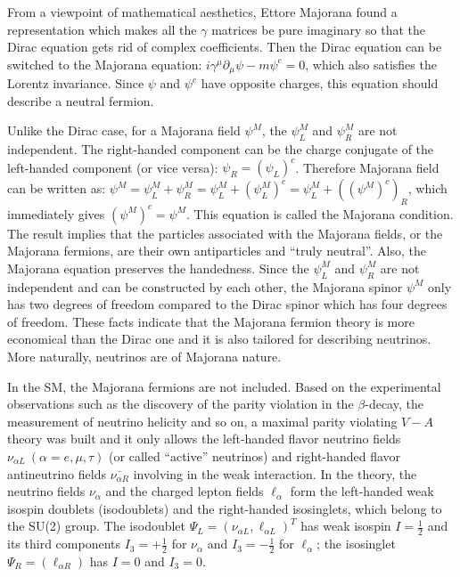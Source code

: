 From a viewpoint of mathematical aesthetics, Ettore Majorana found a representation which makes all the $\gamma$ matrices be pure imaginary so that the Dirac equation gets rid of complex coefficients\cite{majorana2006symmetric}. Then the Dirac equation can be switched to the Majorana equation: $i\gamma^\mu\partial_\mu\psi-m\psi^c=0$, which also satisfies the Lorentz invariance\cite{zee2010quantum}. Since $\psi$ and $\psi^c$ have opposite charges, this equation should describe a neutral fermion\cite{zee2010quantum}. 

Unlike the Dirac case, for a Majorana field $\psi^M$, the $\psi^M_L$ and $\psi^M_R$ are not independent. The right-handed component can be the charge conjugate of the left-handed component (or vice versa): $\psi_R=(\psi_L)^c$\cite{akhmedov2014majorana}. Therefore Majorana field can be written as: $\psi^M=\psi_L^M+\psi_R^M=\psi^M_L+(\psi^M_L)^c=\psi^M_L+((\psi^M)^c)_R$, which immediately gives $(\psi^M)^c=\psi^M$. This equation is called the Majorana condition. The result implies that the particles associated with the Majorana fields, or the Majorana fermions, are their own antiparticles and ``truly neutral''\cite{akhmedov2014majorana}. Also, the Majorana equation preserves the handedness\cite{zee2010quantum}. Since the $\psi^M_L$ and $\psi^M_R$ are not independent and can be constructed by each other, the Majorana spinor $\psi^M$ only has two degrees of freedom compared to the Dirac spinor which has four degrees of freedom. These facts indicate that the Majorana fermion theory is more economical than the Dirac one and it is also tailored for describing neutrinos. More naturally, neutrinos are of Majorana nature.

In the SM, the Majorana fermions are not included. Based on the experimental observations such as the discovery of the parity violation in the $\beta$-decay\cite{wu1957experimental}, the measurement of neutrino helicity\cite{goldhaber1958helicity} and so on, a maximal parity violating $V-A$ theory was built and it only allows the left-handed flavor neutrino fields $\nu_{\alpha L}~(\alpha=e,\mu,\tau)$ (or called ``active'' neutrinos) and right-handed flavor antineutrino fields $\overline{\nu_{\alpha R}}$ involving in the weak interaction. In the theory, the neutrino fields $\nu_\alpha$ and the charged lepton fields $\ell_\alpha$ form the left-handed weak isospin doublets (isodoublets) and the right-handed isosinglets, which belong to the SU(2) group. The isodoublet $\Psi_L = (\nu_{\alpha L}, \ell_{\alpha L})^T$ has weak isospin $I=\frac{1}{2}$ and its third components $I_3=+\frac{1}{2}$ for $\nu_\alpha$ and $I_3=-\frac{1}{2}$ for $\ell_\alpha$; the isosinglet $\Psi_R = (\ell_{\alpha R})$ has $I=0$ and $I_3=0$\cite{aitchison2012gauge, greiner2012theoretical}.

